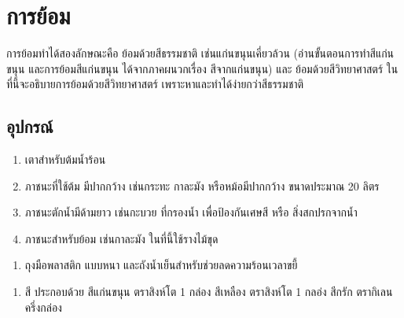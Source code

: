 \chapter{การย้อม}

การย้อมทำได้สองลักษณะคือ ย้อมด้วยสีธรรมชาติ เช่นแก่นขนุนเคี่ยวล้วน
(อ่านขั้นตอนการทำสีแก่นขนุน และการย้อมสีแก่นขนุน ได้จากภาคผนวกเรื่อง สีจากแก่นขนุน) และ
ย้อมด้วยสีวิทยาศาสตร์ ในที่นี้จะอธิบายการย้อมด้วยสีวิทยาศาสตร์
เพราะหาและทำได้ง่ายกว่าสีธรรมชาติ

\section{อุปกรณ์}

\begin{enumerate}
\def\labelenumi{(\arabic{enumi})}
\item
  เตาสำหรับต้มน้ำร้อน
\item
  ภาชนะที่ใช้ต้ม มีปากกว้าง เช่นกระทะ กาละมัง หรือหม้อมีปากกว้าง ขนาดประมาณ 20 ลิตร
\item
  ภาชนะตักน้ำมีด้ามยาว เช่นกะบวย ที่กรองน้ำ เพื่อป้องกันเศษสี หรือ สิ่งสกปรกจากน้ำ
\item
  ภาชนะสำหรับย้อม เช่นกาละมัง ในที่นี้ใช้รางไม้ขุด
\end{enumerate}

\setlength{\nextPhotoWidth}{0.5\textwidth}





\begin{enumerate}
\def\labelenumi{(\arabic{enumi})}
\setcounter{enumi}{4}
\tightlist
\item
  ถุงมือพลาสติก แบบหนา และถังน้ำเย็นสำหรับช่วยลดความร้อนเวลาขยี้
\end{enumerate}



\clearpage

\begin{enumerate}
\def\labelenumi{(\arabic{enumi})}
\setcounter{enumi}{5}
\tightlist
\item
  สี ประกอบด้วย สีแก่นขนุน ตราสิงห์โต 1 กล่อง สีเหลือง ตราสิงห์โต 1 กลอ่ง สีกรัก
  ตรากิเลน ครึ่งกล่อง
\end{enumerate}

